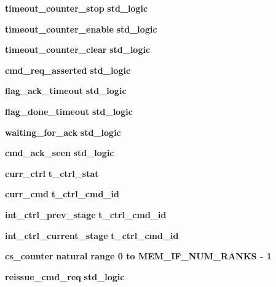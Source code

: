 \begin{DoxyCompactItemize}
\item 
{\bf timeout\+\_\+counter\+\_\+stop} {\bfseries \textcolor{comment}{std\+\_\+logic}\textcolor{vhdlchar}{ }} 
\item 
{\bf timeout\+\_\+counter\+\_\+enable} {\bfseries \textcolor{comment}{std\+\_\+logic}\textcolor{vhdlchar}{ }} 
\item 
{\bf timeout\+\_\+counter\+\_\+clear} {\bfseries \textcolor{comment}{std\+\_\+logic}\textcolor{vhdlchar}{ }} 
\item 
{\bf cmd\+\_\+req\+\_\+asserted} {\bfseries \textcolor{comment}{std\+\_\+logic}\textcolor{vhdlchar}{ }} 
\item 
{\bf flag\+\_\+ack\+\_\+timeout} {\bfseries \textcolor{comment}{std\+\_\+logic}\textcolor{vhdlchar}{ }} 
\item 
{\bf flag\+\_\+done\+\_\+timeout} {\bfseries \textcolor{comment}{std\+\_\+logic}\textcolor{vhdlchar}{ }} 
\item 
{\bf waiting\+\_\+for\+\_\+ack} {\bfseries \textcolor{comment}{std\+\_\+logic}\textcolor{vhdlchar}{ }} 
\item 
{\bf cmd\+\_\+ack\+\_\+seen} {\bfseries \textcolor{comment}{std\+\_\+logic}\textcolor{vhdlchar}{ }} 
\item 
{\bf curr\+\_\+ctrl} {\bfseries {\bfseries {\bf t\+\_\+ctrl\+\_\+stat}} \textcolor{vhdlchar}{ }} 
\item 
{\bf curr\+\_\+cmd} {\bfseries {\bfseries {\bf t\+\_\+ctrl\+\_\+cmd\+\_\+id}} \textcolor{vhdlchar}{ }} 
\item 
{\bf int\+\_\+ctrl\+\_\+prev\+\_\+stage} {\bfseries {\bfseries {\bf t\+\_\+ctrl\+\_\+cmd\+\_\+id}} \textcolor{vhdlchar}{ }} 
\item 
{\bf int\+\_\+ctrl\+\_\+current\+\_\+stage} {\bfseries {\bfseries {\bf t\+\_\+ctrl\+\_\+cmd\+\_\+id}} \textcolor{vhdlchar}{ }} 
\item 
{\bf cs\+\_\+counter} {\bfseries \textcolor{comment}{natural}\textcolor{vhdlchar}{ }\textcolor{vhdlchar}{ }\textcolor{vhdlchar}{ }\textcolor{keywordflow}{range}\textcolor{vhdlchar}{ }\textcolor{vhdlchar}{ } \textcolor{vhdldigit}{0} \textcolor{vhdlchar}{ }\textcolor{keywordflow}{to}\textcolor{vhdlchar}{ }\textcolor{vhdlchar}{ }\textcolor{vhdlchar}{ }\textcolor{vhdlchar}{ }{\bfseries {\bf M\+E\+M\+\_\+\+I\+F\+\_\+\+N\+U\+M\+\_\+\+R\+A\+N\+KS}} \textcolor{vhdlchar}{-\/}\textcolor{vhdlchar}{ } \textcolor{vhdldigit}{1} \textcolor{vhdlchar}{ }} 
\item 
{\bf reissue\+\_\+cmd\+\_\+req} {\bfseries \textcolor{comment}{std\+\_\+logic}\textcolor{vhdlchar}{ }} 

\end{DoxyCompactItemize}
